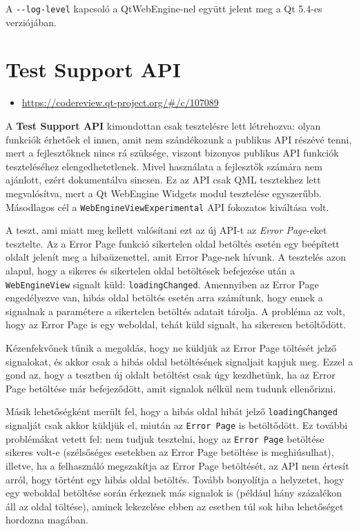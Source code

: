 \documentclass[12pt]{report}
\let\origurl\url
\renewcommand{\url}[1]{%
    \textcolor{blue}{\origurl{#1}}
}
\newcommand{\gerrit}[1]{%
    \textcolor{qtgreen}{\origurl{https://codereview.qt-project.org/\#/c/#1}}
}
\begin{document}
A \texttt{-{}-log-level} kapcsoló a QtWebEngine-nel együtt jelent meg a Qt 5.4-es
verziójában.


\section{Test Support API}

\begin{center}
    \begin{reviewbox}
        \begin{itemize}
            \renewcommand{\labelitemi}{\textcolor{qtgreen}{$\blacktriangleright$}}
            \item \gerrit{107089}
        \end{itemize}
    \end{reviewbox}
\end{center}

\noindent
A \textbf{Test Support API} kimondottan csak tesztelésre lett létrehozva: olyan funkciók
érhetőek el innen, amit nem szándékozunk a publikus API részévé tenni, mert a fejlesztőknek
nincs rá szüksége, viszont bizonyos publikus API funkciók teszteléséhez elengedhetetlenek.
Mivel használata a fejlesztők számára nem ajánlott, ezért dokumentálva sincsen. Ez az API
csak QML tesztekhez lett megvalósítva, mert a Qt WebEngine Widgets modul tesztelése
egyszerűbb. Másodlagos cél a \texttt{WebEngineViewExperimental} API fokozatos kiváltása volt.

A teszt, ami miatt meg kellett valósítani ezt az új API-t az \textit{Error Page}-eket
tesztelte. Az a Error Page funkció sikertelen oldal betöltés esetén egy beépített oldalt
jelenít meg a hibaüzenettel, amit Error Page-nek hívunk. A tesztelés azon alapul, hogy a
sikeres és sikertelen oldal betöltések befejezése után a \texttt{WebEngineView} signalt küld:
\texttt{loadingChanged}. Amennyiben az Error Page engedélyezve van, hibás oldal betöltés
esetén arra számítunk, hogy ennek a signalnak a paramétere a sikertelen betöltés adatait
tárolja. A probléma az volt, hogy az Error Page is egy weboldal, tehát küld signalt, ha
sikeresen betöltődött.

Kézenfekvőnek tűnik a megoldás, hogy ne küldjük az Error Page töltését jelző signalokat, és
akkor csak a hibás oldal betöltésének signaljait kapjuk meg. Ezzel a gond az, hogy a tesztben
új oldalt betöltést csak úgy kezdhetünk, ha az Error Page betöltése már befejeződött, amit
signalok nélkül nem tudunk ellenőrizni.

Másik lehetőségként merült fel, hogy a hibás oldal hibát jelző \texttt{loadingChanged}
signalját csak akkor küldjük el, miután az \texttt{Error Page} is betöltődött. Ez további
problémákat vetett fel: nem tudjuk tesztelni, hogy az \texttt{Error Page} betöltése sikeres
volt-e (szélsőséges esetekben az Error Page betöltése is meghiúsulhat), illetve, ha a
felhasználó megszakítja az Error Page betöltését, az API nem értesít arról, hogy történt egy
hibás oldal betöltés. Tovább bonyolítja a helyzetet, hogy egy weboldal betöltése során
érkeznek más signalok is (például hány százalékon áll az oldal töltése), aminek lekezelése
ebben az esetben túl sok hiba lehetőséget hordozna magában.
\end{document}
